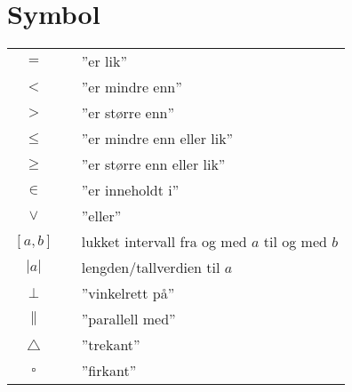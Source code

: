 



\section*{Symbol} \label{Symbol}
\renewcommand{\arraystretch}{1.2}
\begin{tabular}{@{}cp{0.4cm}l}
$ = $ && ''er lik'' \\
$ < $ && ''er mindre enn'' \\
$ > $ && ''er større enn'' \\
$ \leq $ && ''er mindre enn eller lik'' \\
$ \geq $ && ''er større enn eller lik'' \\		
$ \in $ && ''er inneholdt i'' \\
$ \vee $&&''eller''\\
$ [a, b] $ && lukket intervall fra og med $ a $ til og med $ b $\\
$|a| $ &&  lengden/tallverdien til $ a $\\
$\perp $ &&  ''vinkelrett på'' \\
$\parallel $ &&  ''parallell med'' \\
$\triangle $ &&  ''trekant'' \\
$\square $ &&  ''firkant'' \\
\end{tabular}
\renewcommand{\arraystretch}{1}

